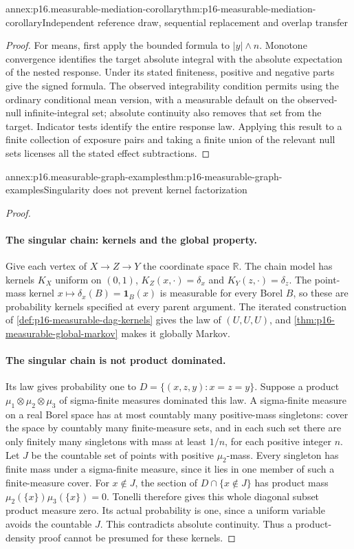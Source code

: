 \begin{annexitem}{annex:p16.measurable-mediation-corollary}{thm:p16-measurable-mediation-corollary}{Independent reference draw, sequential replacement and overlap transfer}
\begin{proof}
For means, first apply the bounded formula to \(|y|\wedge n\).
Monotone convergence identifies the target absolute integral with
the absolute expectation of the nested response. Under its stated
finiteness, positive and negative parts give the signed formula.
The observed integrability condition permits using the ordinary
conditional mean version, with a measurable default on the
observed-null infinite-integral set; absolute continuity also removes
that set from the target. Indicator tests identify the entire response
law. Applying this result to a finite collection of exposure pairs
and taking a finite union of the relevant null sets licenses all
the stated effect subtractions.
\end{proof}
\end{annexitem}

\begin{annexitem}{annex:p16.measurable-graph-examples}{thm:p16-measurable-graph-examples}{Singularity does not prevent kernel factorization}
\begin{proof}
\paragraph{The singular chain: kernels and the global property.}
Give each vertex of \(X\to Z\to Y\) the coordinate space
\(\mathbb R\). The chain model has kernels \(K_X\) uniform on
\((0,1)\), \(K_Z(x,\cdot)=\delta_x\) and \(K_Y(z,\cdot)=\delta_z\).
The point-mass kernel \(x\mapsto\delta_x(B)=\mathbf1_B(x)\) is
measurable for every Borel \(B\), so these are probability kernels
specified at every parent argument. The iterated construction of
\cref{def:p16-measurable-dag-kernels} gives the law of
\((U,U,U)\), and \cref{thm:p16-measurable-global-markov} makes it
globally Markov.

\paragraph{The singular chain is not product dominated.}
Its law gives
probability one to \(D=\{(x,z,y):x=z=y\}\). Suppose a product
\(\mu_1\otimes\mu_2\otimes\mu_3\) of sigma-finite measures
dominated this law. A sigma-finite measure on a real Borel space has
at most countably many positive-mass singletons: cover the space by
countably many finite-measure sets, and in each such set there are
only finitely many singletons with mass at least \(1/n\), for each
positive integer \(n\). Let \(J\) be the countable set of points with
positive \(\mu_2\)-mass. Every singleton has finite mass under a sigma-finite
measure, since it lies in one member of such a finite-measure cover.
For \(x\notin J\), the section of
\(D\cap\{x\notin J\}\) has product mass
\(\mu_2(\{x\})\mu_3(\{x\})=0\). Tonelli therefore gives this
whole diagonal subset product measure zero. Its actual probability
is one, since a uniform variable avoids the countable \(J\).
This contradicts absolute continuity. Thus a product-density proof
cannot be presumed for these kernels.


\end{proof}
\end{annexitem}
